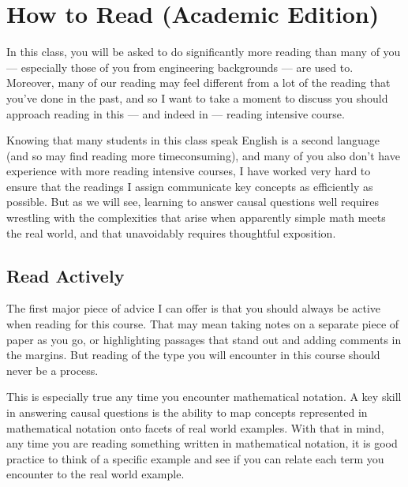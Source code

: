 \documentclass[letterpaper,10pt,english]{jupyterBook}
\begin{document}
\sphinxstepscope


\chapter{How to Read (Academic Edition)}
\label{\detokenize{40_in_practice/00_how_to_read_this_book:how-to-read-academic-edition}}\label{\detokenize{40_in_practice/00_how_to_read_this_book::doc}}
\sphinxAtStartPar
In this class, you will be asked to do significantly more reading than many of you — especially those of you from engineering backgrounds — are used to. Moreover, many of our reading may feel different from a lot of the reading that you’ve done in the past, and so I want to take a moment to discuss  you should approach reading in this — and indeed in  — reading intensive course.

\sphinxAtStartPar
Knowing that many students in this class speak English is a second language (and so may find reading more time\sphinxhyphen{}consuming), and many of you also don’t have experience with more reading intensive courses, I have worked very hard to ensure that the readings I assign communicate key concepts as efficiently as possible. But as we will see, learning to answer causal questions well requires wrestling with the complexities that arise when apparently simple math meets the real world, and that unavoidably requires thoughtful exposition.


\section{Read Actively}
\label{\detokenize{40_in_practice/00_how_to_read_this_book:read-actively}}
\sphinxAtStartPar
The first major piece of advice I can offer is that you should always be active when reading for this course. That may mean taking notes on a separate piece of paper as you go, or highlighting passages that stand out and adding comments in the margins. But reading of the type you will encounter in this course should never be a  process.

\sphinxAtStartPar
This is especially true any time you encounter mathematical notation. A key skill in answering causal questions is the ability to map concepts represented in mathematical notation onto facets of real world examples. With that in mind, any time you are reading something written in mathematical notation, it is good practice to think of a specific example and see if you can relate each term you encounter to the real world example.
\end{document}
